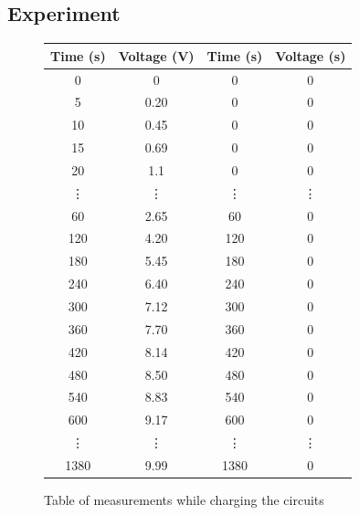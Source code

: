 \documentclass[a4paper]{article}
\begin{document}
\subsection{Experiment}
\begin{figure}[H]
\centering
\begin{tabular}{|c|c|c|c|}
    \hline
    Time (s) & Voltage (V) & Time (s) & Voltage (s)\\
    \hline
    0 & 0 & 0 & 0\\
    5 & 0.20 & 0 & 0\\
    10 & 0.45 & 0 & 0\\
    15 & 0.69 & 0 & 0\\
    20 & 1.1 & 0 & 0\\
    \vdots & \vdots & \vdots & \vdots\\
    60 & 2.65 & 60 & 0\\
    120 & 4.20 & 120 & 0\\
    180 & 5.45 & 180 & 0\\
    240 & 6.40 & 240 & 0\\
    300 & 7.12 & 300 & 0\\
    360 & 7.70 & 360 & 0\\
    420 & 8.14 & 420 & 0\\
    480 & 8.50 & 480 & 0\\
    540 & 8.83 & 540 & 0\\
    600 & 9.17 & 600 & 0\\
    \vdots & \vdots & \vdots & \vdots\\
    1380 & 9.99 & 1380 & 0\\
    \hline   
\end{tabular}
\caption{Table of measurements while charging the circuits}
\end{figure}
\end{document}
